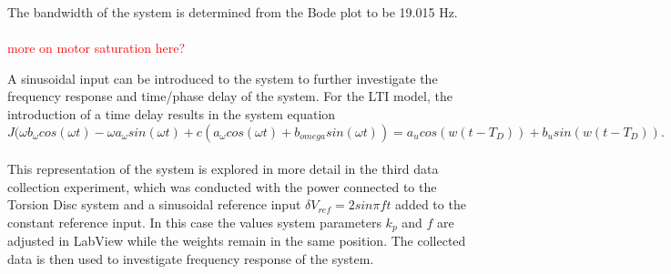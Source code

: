 \documentclass[11pt,titlepage]{article}
\begin{document}
	The bandwidth of the system is determined from the Bode plot to be 19.015 Hz. \\\\
	\textcolor{red}{more on motor saturation here?}
	
	A sinusoidal input can be introduced to the system to further investigate the frequency response and time/phase delay of the system. For the LTI model, the introduction of a time delay results in the system equation 
	\begin{equation}
		J(\omega b_{\omega}cos(\omega t)-\omega a_{\omega}sin(\omega t)+c(a_{\omega}cos(\omega t)+b_{omega}sin(\omega t)) = a_ucos(w(t-T_D))+b_usin(w(t-T_D)).
	\end{equation}
	\\
	This representation of the system is explored in more detail in the third data collection experiment, which was conducted with the power connected to the Torsion Disc system and a sinusoidal reference input $\delta V_{ref}=2sin\pi ft$ added to the constant reference input. In this case the values system parameters $k_p$ and $f$ are adjusted in LabView while the weights remain in the same position. The collected data is then used to investigate frequency response of the system.
\end{document}
